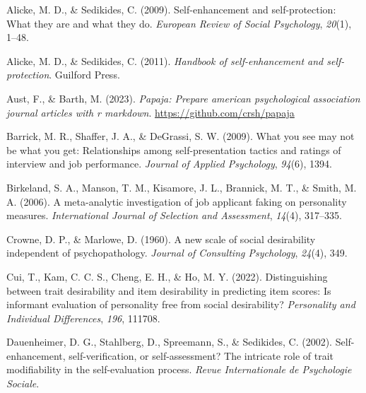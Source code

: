 \documentclass[
  ,jou]{apa6}
\newlength{\cslhangindent}
\newlength{\cslentryspacingunit} %
\newenvironment{CSLReferences}[2] %
 {%
  \setlength{\parindent}{0pt}
  \ifodd #1
  \let\oldpar\par
  \def\par{\hangindent=\cslhangindent\oldpar}
  \fi
  \setlength{\parskip}{#2\cslentryspacingunit}
 }%
 {}
\begin{document}
\hypertarget{refs}{}
\begin{CSLReferences}{1}{0}
\leavevmode{}%
Alicke, M. D., \& Sedikides, C. (2009). Self-enhancement and self-protection: What they are and what they do. \emph{European Review of Social Psychology}, \emph{20}(1), 1--48.

\leavevmode{}%
Alicke, M. D., \& Sedikides, C. (2011). \emph{Handbook of self-enhancement and self-protection}. Guilford Press.

\leavevmode{}%
Aust, F., \& Barth, M. (2023). \emph{Papaja: Prepare american psychological association journal articles with r markdown}. \url{https://github.com/crsh/papaja}

\leavevmode{}%
Barrick, M. R., Shaffer, J. A., \& DeGrassi, S. W. (2009). What you see may not be what you get: Relationships among self-presentation tactics and ratings of interview and job performance. \emph{Journal of Applied Psychology}, \emph{94}(6), 1394.

\leavevmode{}%
Birkeland, S. A., Manson, T. M., Kisamore, J. L., Brannick, M. T., \& Smith, M. A. (2006). A meta-analytic investigation of job applicant faking on personality measures. \emph{International Journal of Selection and Assessment}, \emph{14}(4), 317--335.

\leavevmode{}%
Crowne, D. P., \& Marlowe, D. (1960). A new scale of social desirability independent of psychopathology. \emph{Journal of Consulting Psychology}, \emph{24}(4), 349.

\leavevmode{}%
Cui, T., Kam, C. C. S., Cheng, E. H., \& Ho, M. Y. (2022). Distinguishing between trait desirability and item desirability in predicting item scores: Is informant evaluation of personality free from social desirability? \emph{Personality and Individual Differences}, \emph{196}, 111708.

\leavevmode{}%
Dauenheimer, D. G., Stahlberg, D., Spreemann, S., \& Sedikides, C. (2002). Self-enhancement, self-verification, or self-assessment? The intricate role of trait modifiability in the self-evaluation process. \emph{Revue Internationale de Psychologie Sociale}.


\end{CSLReferences}
\end{document}

